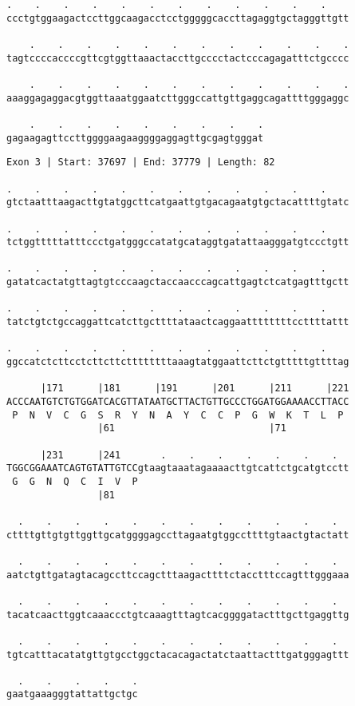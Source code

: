 \documentclass{article}
\begin{document}
\newpage
\begin{Verbatim}[fontfamily=courier]
    .    .    .    .    .    .    .    .    .    .    .    .
ccctgtggaagactccttggcaagacctcctgggggcaccttagaggtgctagggttgtt

    .    .    .    .    .    .    .    .    .    .    .    .
tagtccccaccccgttcgtggttaaactaccttgcccctactcccagagatttctgcccc

    .    .    .    .    .    .    .    .    .    .    .    .
aaaggagaggacgtggttaaatggaatcttgggccattgttgaggcagattttgggaggc

    .    .    .    .    .    .    .    .    .
gagaagagttccttggggaagaaggggaggagttgcgagtgggat
\end{Verbatim}
\newpage
\begin{Verbatim}[fontfamily=courier]
Exon 3 | Start: 37697 | End: 37779 | Length: 82

.    .    .    .    .    .    .    .    .    .    .    .    
gtctaatttaagacttgtatggcttcatgaattgtgacagaatgtgctacattttgtatc

.    .    .    .    .    .    .    .    .    .    .    .    
tctggtttttatttccctgatgggccatatgcataggtgatattaagggatgtccctgtt

.    .    .    .    .    .    .    .    .    .    .    .    
gatatcactatgttagtgtcccaagctaccaacccagcattgagtctcatgagtttgctt

.    .    .    .    .    .    .    .    .    .    .    .    
tatctgtctgccaggattcatcttgcttttataactcaggaattttttttccttttattt

.    .    .    .    .    .    .    .    .    .    .    .    
ggccatctcttcctcttcttcttttttttaaagtatggaattcttctgtttttgttttag

      |171      |181      |191      |201      |211      |221
ACCCAATGTCTGTGGATCACGTTATAATGCTTACTGTTGCCCTGGATGGAAAACCTTACC
 P  N  V  C  G  S  R  Y  N  A  Y  C  C  P  G  W  K  T  L  P 
                |61                           |71           

      |231      |241       .    .    .    .    .    .    .  
TGGCGGAAATCAGTGTATTGTCCgtaagtaaatagaaaacttgtcattctgcatgtcctt
 G  G  N  Q  C  I  V  P                                     
                |81                                         

  .    .    .    .    .    .    .    .    .    .    .    .  
cttttgttgtgttggttgcatggggagccttagaatgtggccttttgtaactgtactatt

  .    .    .    .    .    .    .    .    .    .    .    .  
aatctgttgatagtacagccttccagctttaagacttttctacctttccagtttgggaaa

  .    .    .    .    .    .    .    .    .    .    .    .  
tacatcaacttggtcaaaccctgtcaaagtttagtcacggggatactttgcttgaggttg

  .    .    .    .    .    .    .    .    .    .    .    .  
tgtcatttacatatgttgtgcctggctacacagactatctaattactttgatgggagttt

  .    .    .    .    .
gaatgaaagggtattattgctgc
\end{Verbatim}
\end{document}
